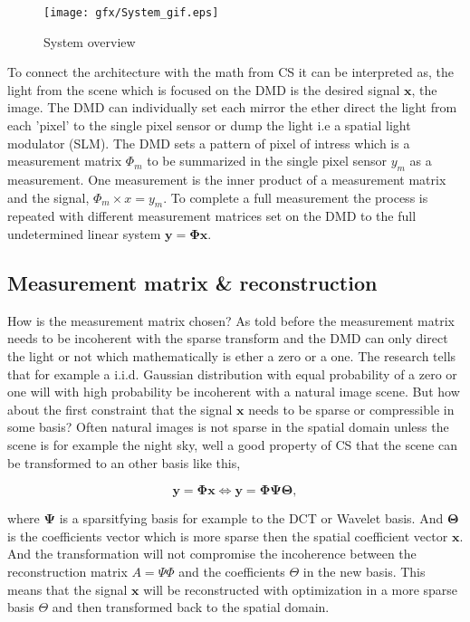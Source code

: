 

\begin{figure}[H]
\texttt{[image: gfx/System\_gif.eps]}
	\caption{System overview}
	\label{fig:system_overview}
\end{figure}	

To connect the architecture with the math from CS it can be interpreted as, the light from the scene which is focused on the DMD is the desired signal $\mathbf{x}$, the image. The DMD can individually set each mirror the ether direct the light from each 'pixel' to the single pixel sensor or dump the light i.e a spatial light modulator (SLM). The DMD sets a pattern of pixel of intress which is a measurement matrix $\Phi_m$ to be summarized in the single pixel sensor $y_m$ as a measurement. One measurement is the inner product of a measurement matrix and the signal, $\Phi_m \times x = y_m$. To complete a full measurement the process is repeated with different measurement matrices set on the DMD to the full undetermined linear system $ \mathbf{y} = \mathbf{\Phi}\mathbf{x}$.

\subsection{Measurement matrix \& reconstruction}
How is the measurement matrix chosen? As told before the measurement matrix needs to be incoherent with the sparse transform and the DMD can only direct the light or not which mathematically is ether a zero or a one. The research tells that for example a i.i.d. Gaussian distribution with equal probability of a zero or one will with high probability be incoherent with a natural image scene. But how about the first constraint that the signal $\mathbf{x}$ needs to be sparse or compressible in some basis? Often natural images is not sparse in the spatial domain unless the scene is for example the night sky, well a good property of CS that the scene can be transformed to an other basis like this,

\begin{equation}
\label{eq:CS_1}
\mathbf{y} = \mathbf{\Phi} \mathbf{x} \Leftrightarrow \mathbf{y} = \mathbf{\Phi} \mathbf{\Psi} \mathbf{\Theta},
\end{equation}

where $\mathbf{\Psi}$ is a sparsitfying basis for example to the DCT or Wavelet basis. And $\mathbf{\Theta}$ is the coefficients vector which is more sparse then the spatial coefficient vector $\mathbf{x}$. And the transformation will not compromise the incoherence between the reconstruction matrix $A = \Psi\Phi$ and the coefficients $\Theta$ in the new basis. This means that the signal $\mathbf{x}$ will be reconstructed with optimization in a more sparse basis $\Theta$ and then transformed back to the spatial domain.\\[0.1in]

